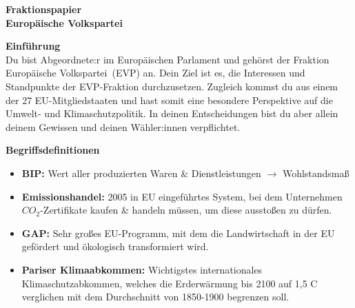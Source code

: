 \documentclass[11pt]{article}
\newcommand{\Fraktionsname}{Europäische Volkspartei}
\newcommand{\Fraktionskuerzel}{EVP}
\newcommand{\Fraktionsname}{Progressive Allianz der Sozialdemokraten}
\newcommand{\Fraktionskuerzel}{S\&D}
\newcommand{\Fraktionsname}{Renew Europe}
\newcommand{\Fraktionskuerzel}{Renew}
\newcommand{\Fraktionsname}{Die Grünen/Europäische Freie Allianz}
\newcommand{\Fraktionskuerzel}{Grüne/EFA}
\newcommand{\Fraktionsname}{Patrioten für Europa}
\newcommand{\Fraktionskuerzel}{PfE}
\newcommand{\policy}{Umwelt- und Klimaschutzpolitik}
\newcommand{\glossar}{
        		\item \textbf{Emissionshandel:} 2005 in EU eingeführtes System, bei dem Unternehmen $CO_2$-Zertifikate kaufen \& handeln müssen, um diese ausstoßen zu dürfen.
        		\item \textbf{GAP:} Sehr großes EU-Programm, mit dem  die Landwirtschaft in der EU gefördert und ökologisch transformiert wird.
        		\item \textbf{Pariser Klimaabkommen:} Wichtigstes internationales Klimaschutzabkommen, welches die Erderwärmung bis 2100 auf 1,5 \degree C verglichen mit dem Durchschnitt von 1850-1900 begrenzen soll.
        }
\newcommand{\policy}{Asyl- \& Migrationspolitik}
\newcommand{\glossar}{
        		\item \textbf{Dublin-Verordnung:} Legt fest, dass der EU-Mitgliedstaat für Asylverfahren zuständig ist, der zuerst von Asylsuchendem betreten wurde.
        		\item \textbf{Solidaritätsmechnismus:} Jeder EU-Mitgliedstaat muss einen bestimmten Anteil der Asylsuchenden aufnehmen.
        		\item \textbf{Drittstaatenverfahren:} Schutzsuchende sollen in Nicht-EU-Staaten gebracht und deren Asylantrag dort bearbeitet werden.
        }
\newcommand{\policy}{Außen- und Sicherheitspolitik}
\newcommand{\glossar}{
            \item \textbf{Europäische Verteidigungs-\newline agentur:} Unterstützt EU-\newline Mitgliedstaaten bei der Entwicklung ihrer militärischen Ressourcen 
            \item \textbf{Hoher Vertreter für Außen- und Sicherheitspolitik:} Vizepräsident der EU-Kommission, der als "EU-Außenminister" agiert
            \item \textbf{Rüstungskontrolle:} Internationale Vereinbarungen zur Verringerung/zum Verbot bestimmter Waffen
            \item \textbf{Verteidigungsfonds:} Geldreserve der EU, aus der Rüstungsprojekte der Mitgliedstaaten gefördert werden
     	}
\begin{document}
\vspace*{1cm}

\noindent \textbf{\huge Fraktionspapier}\\
\newline
\textbf{\huge \Fraktionsname}
\newline

\vspace{1cm}
\noindent
\begin{minipage}[t]{0.45\textwidth}
    \textbf{\Large Einführung}\\
    \newline
    Du bist Abgeordnete:r im Europäischen Parlament und gehörst der Fraktion \Fraktionsname\ (\Fraktionskuerzel) an. Dein Ziel ist es, die Interessen und Standpunkte der \Fraktionskuerzel -Fraktion durchzusetzen. Zugleich kommst du aus einem der 27 EU-Mitgliedstaaten und hast somit eine besondere Perspektive auf die \policy. In deinen Entscheidungen bist du aber allein deinem Gewissen und deinen Wähler:innen verpflichtet. \newline
    
    \vspace*{0.4cm}
    
    \textbf{\Large Begriffsdefinitionen}\\
    \raggedright
    \vspace{-0.5cm}
    \begin{itemize}
        \item \textbf{BIP:} Wert aller produzierten Waren \& Dienstleistungen $\to$ Wohlstandsmaß
        \glossar
    \end{itemize}
\end{minipage}%
\hfill
\end{document}

